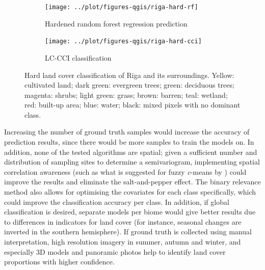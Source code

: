 \documentclass[a4paper,12pt]{scrbook}
\begin{document}
\begin{figure}
  \begin{subfigure}{0.48\textwidth}
    \centering
    \texttt{[image: ../plot/figures-qgis/riga-hard-rf]}
    \caption{Hardened random forest regression prediction}
  \end{subfigure} \hfill
  \begin{subfigure}{0.48\textwidth}
    \centering
    \texttt{[image: ../plot/figures-qgis/riga-hard-cci]}
    \caption{LC-CCI classification}
  \end{subfigure}
  \caption{Hard land cover classification of Riga and its surroundings. Yellow: cultivated land; dark green: evergreen trees; green: deciduous trees; magenta: shrubs; light green: grass; brown: barren; teal: wetland; red: built-up area; blue: water; black: mixed pixels with no dominant class.}
  \label{fig-hard-rf}
\end{figure}

Increasing the number of ground truth samples would increase the accuracy of prediction results, since there would be more samples to train the models on. In addition, none of the tested algorithms are spatial; given a sufficient number and distribution of sampling sites to determine a semivariogram, implementing spatial correlation awareness (such as what is suggested for fuzzy \textit{c}-means by \citet{gong2013improvedcmeans}) could improve the results and eliminate the salt-and-pepper effect. The binary relevance method also allows for optimising the covariates for each class specifically, which could improve the classification accuracy per class. In addition, if global classification is desired, separate models per biome would give better results due to differences in indicators for land cover (for instance, seasonal changes are inverted in the southern hemisphere). If ground truth is collected using manual interpretation, high resolution imagery in summer, autumn and winter, and especially 3D models and panoramic photos help to identify land cover proportions with higher confidence.
\end{document}
